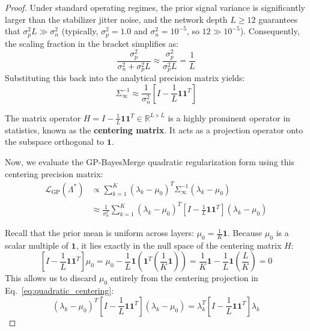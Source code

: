 \documentclass{article}
\theoremstyle{plain}
\theoremstyle{definition}
\theoremstyle{remark}
\begin{document}
\begin{proof}
Under standard operating regimes, the prior signal variance is significantly larger than the stabilizer jitter noise, and the network depth $L \ge 12$ guarantees that $\sigma_p^2 L \gg \sigma_n^2$ (typically, $\sigma_p^2 = 1.0$ and $\sigma_n^2 = 10^{-5}$, so $12 \gg 10^{-5}$). Consequently, the scaling fraction in the bracket simplifies as:
\begin{equation}
\frac{\sigma_p^2}{\sigma_n^2 + \sigma_p^2 L} \approx \frac{\sigma_p^2}{\sigma_p^2 L} = \frac{1}{L}
\end{equation}
Substituting this back into the analytical precision matrix yields:
\begin{equation}
\Sigma_{\infty}^{-1} \approx \frac{1}{\sigma_n^2} \left[ I - \frac{1}{L} \mathbf{1} \mathbf{1}^T \right]
\label{eq:centering_precision}
\end{equation}

The matrix operator $H = I - \frac{1}{L} \mathbf{1} \mathbf{1}^T \in \mathbb{R}^{L \times L}$ is a highly prominent operator in statistics, known as the \textbf{centering matrix}. It acts as a projection operator onto the subspace orthogonal to $\mathbf{1}$.

Now, we evaluate the GP-BayesMerge quadratic regularization form using this centering precision matrix:
\begin{equation}
\begin{aligned}
\mathcal{L}_{\text{GP}}(\Lambda^*) &\propto \sum_{k=1}^K (\lambda_k - \mu_0)^T \Sigma_{\infty}^{-1} (\lambda_k - \mu_0) \\
&\approx \frac{1}{\sigma_n^2} \sum_{k=1}^K (\lambda_k - \mu_0)^T \left[ I - \frac{1}{L} \mathbf{1} \mathbf{1}^T \right] (\lambda_k - \mu_0)
\end{aligned}
\label{eq:quadratic_centering}
\end{equation}

Recall that the prior mean is uniform across layers: $\mu_0 = \frac{1}{K} \mathbf{1}$. Because $\mu_0$ is a scalar multiple of $\mathbf{1}$, it lies exactly in the null space of the centering matrix $H$:
\begin{equation}
\left[ I - \frac{1}{L} \mathbf{1} \mathbf{1}^T \right] \mu_0 = \mu_0 - \frac{1}{L} \mathbf{1} \left( \mathbf{1}^T \left(\frac{1}{K} \mathbf{1}\right) \right) = \frac{1}{K} \mathbf{1} - \frac{1}{L} \mathbf{1} \left( \frac{L}{K} \right) = 0
\end{equation}
This allows us to discard $\mu_0$ entirely from the centering projection in Eq.~\ref{eq:quadratic_centering}:
\begin{equation}
(\lambda_k - \mu_0)^T \left[ I - \frac{1}{L} \mathbf{1} \mathbf{1}^T \right] (\lambda_k - \mu_0) = \lambda_k^T \left[ I - \frac{1}{L} \mathbf{1} \mathbf{1}^T \right] \lambda_k
\label{eq:discard_mu}
\end{equation}


\end{proof}
\end{document}
